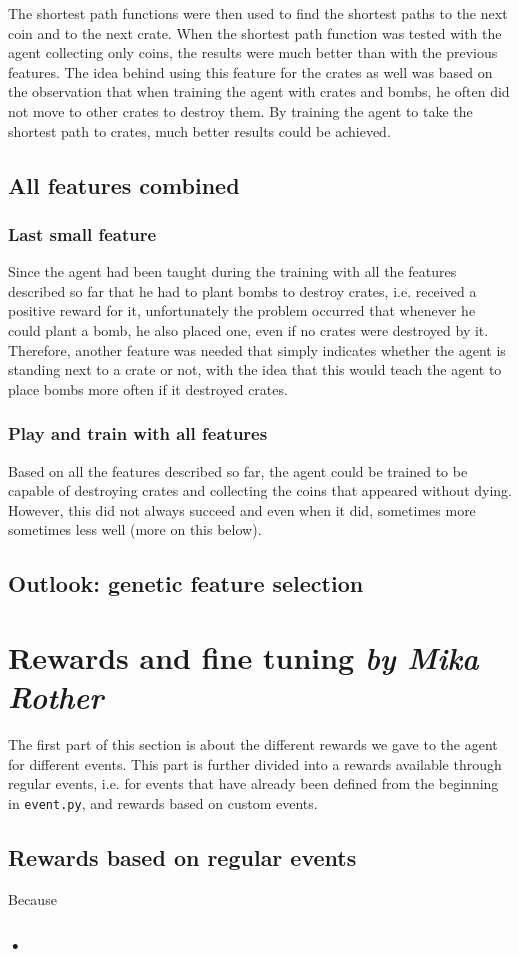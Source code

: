The shortest path functions were then used to find the shortest paths to the next coin and to the next crate. When the shortest path function was tested with the agent collecting only coins, the results were much better than with the previous features. The idea behind using this feature for the crates as well was based on the observation that when training the agent with crates and bombs, he often did not move to other crates to destroy them. By training the agent to take the shortest path to crates, much better results could be achieved.

\subsection{All features combined}

\subsubsection*{Last small feature}
Since the agent had been taught during the training with all the features described so far that he had to plant bombs to destroy crates, i.e. received a positive reward for it, unfortunately the problem occurred that whenever he could plant a bomb, he also placed one, even if no crates were destroyed by it. Therefore, another feature was needed that simply indicates whether the agent is standing next to a crate or not, with the idea that this would teach the agent to place bombs more often if it destroyed crates.

\subsubsection*{Play and train with all features}
Based on all the features described so far, the agent could be trained to be capable of destroying crates and collecting the coins that appeared without dying. However, this did not always succeed and even when it did, sometimes more sometimes less well (more on this below). 

\subsection{Outlook: genetic feature selection}


\section[Rewards and fine tuning]{Rewards and fine tuning \hfill \small \normalfont\textit{by Mika Rother}}
The first part of this section is about the different rewards we gave to the agent for different events. This part is further divided into a rewards available through regular events, i.e. for events that have already been defined from the beginning in \texttt{event.py}, and rewards based on custom events.

\subsection{Rewards based on regular events}
Because 

\subsubsection*{•}








